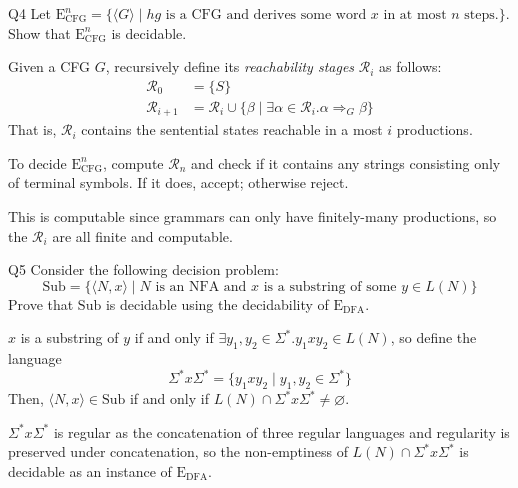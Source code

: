 \documentclass{article}
\theoremstyle{definition}
\theoremstyle{definition}
\theoremstyle{remark}
\begin{document}
\begin{questionbox}{Q4}
    Let $\text{E}_\text{CFG}^n=\bigl\{\langle G\rangle\mid hg\text{ is a CFG and derives some word }x\text{ in at most }n\text{ steps}.\bigr\}$. Show that $\text{E}_\text{CFG}^n$ is decidable.
\end{questionbox}

\bigskip

Given a CFG $G$, recursively define its \textit{reachability stages} $\mathcal{R}_i$ as follows:
\begin{align*}
    \mathcal{R}_0&=\{S\}\\
    \mathcal{R}_{i+1}&=\mathcal{R}_i\cup\{\beta\mid\exists\alpha\in\mathcal{R}_i.\alpha\Rightarrow_G\beta\}
\end{align*}
That is, $\mathcal{R}_i$ contains the sentential states reachable in a most $i$ productions.

To decide $\text{E}_\text{CFG}^n$, compute $\mathcal{R}_n$ and check if it contains any strings consisting only of terminal symbols. If it does, accept; otherwise reject.

This is computable since grammars can only have finitely-many productions, so the $\mathcal{R}_i$ are all finite and computable.





\begin{questionbox}{Q5}
    Consider the following decision problem:
    \begin{equation*}
        \text{Sub}=\bigl\{\langle N,x\rangle\mid N\text{ is an NFA and }x\text{ is a substring of some }y\in L(N)\bigr\}
    \end{equation*}
    Prove that $\text{Sub}$ is decidable using the decidability of $\text{E}_\text{DFA}$.
\end{questionbox}

\bigskip

$x$ is a substring of $y$ if and only if $\exists y_1,y_2\in\Sigma^\ast.y_1xy_2\in L(N)$, so define the language
\begin{equation*}
    \Sigma^\ast x\Sigma^\ast=\{y_1xy_2\mid y_1,y_2\in\Sigma^\ast\}
\end{equation*}
Then, $\langle N,x\rangle\in\text{Sub}$ if and only if $L(N)\cap\Sigma^\ast x\Sigma^\ast\neq\varnothing$.

$\Sigma^\ast x\Sigma^\ast$ is regular as the concatenation of three regular languages and regularity is preserved under concatenation, so the non-emptiness of $L(N)\cap\Sigma^\ast x\Sigma^\ast$ is decidable as an instance of $\text{E}_\text{DFA}$.
\end{document}

